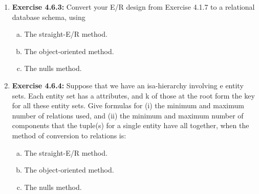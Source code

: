 \documentclass[12pt]{article}
\begin{document}
\begin{enumerate}[1.]
    \item \textbf{Exercise 4.6.3:} Convert your E/R design from Exercise 4.1.7 to a relational
    database schema, using

    \bigskip

    \begin{enumerate}[a)]
        \item The straight-E/R method.
        \item The object-oriented method.
        \item The nulls method.
    \end{enumerate}

    \item \textbf{Exercise 4.6.4:} Suppose that we have an isa-hierarchy involving e entity sets.
    Each entity set has a attributes, and k of those at the root form the key for all
    these entity sets. Give formulas for (i) the minimum and maximum number of
    relations used, and (ii) the minimum and maximum number of components that
    the tuple(s) for a single entity have all together, when the method of conversion
    to relations is:

    \bigskip

    \begin{enumerate}[a)]
        \item The straight-E/R method.
        \item The object-oriented method.
        \item The nulls method.
    \end{enumerate}



\end{enumerate}
\end{document}

